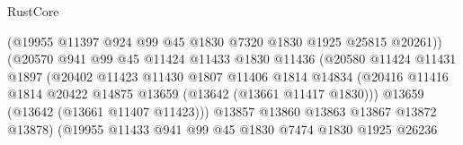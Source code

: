 \begin{lexlean}{RustCore}
\begin{coremodule}
                                      (@19955
                                        @11397
                                        @924
                                        @99
                                        @45
                                        @1830
                                        @7320
                                        @1830
                                        @1925
                                        @25815
                                        @20261))
                                    (@20570
                                      @941
                                      @99
                                      @45
                                      @11424
                                      @11433
                                      @1830
                                      @11436
                                      (@20580
                                        @11424
                                        @11431
                                        @1897
                                        (@20402
                                          @11423
                                          @11430
                                          @1807
                                          @11406
                                          @1814
                                          @14834
                                          (@20416
                                            @11416
                                            @1814
                                            @20422
                                            @14875
                                            @13659
                                            (@13642 (@13661 @11417 @1830)))
                                          @13659
                                          (@13642 (@13661 @11407 @11423)))
                                        @13857
                                        @13860
                                        @13863
                                        @13867
                                        @13872
                                        @13878)
                                      (@19955
                                        @11433
                                        @941
                                        @99
                                        @45
                                        @1830
                                        @7474
                                        @1830
                                        @1925
                                        @26236

\end{coremodule}
\end{lexlean}
